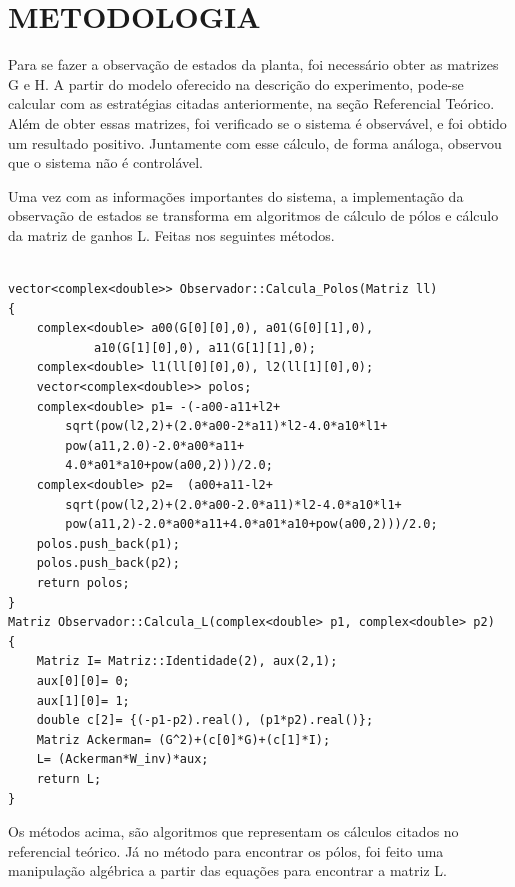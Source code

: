 \documentclass[a4paper,12pt]{article}
\begin{document}
\newpage



\section{METODOLOGIA}

\hspace{4ex}Para se fazer a observação de estados da planta, foi necessário obter as matrizes G e H. A partir do modelo oferecido na descrição do experimento, pode-se calcular com as estratégias citadas anteriormente, na seção Referencial Teórico. Além de obter essas matrizes, foi verificado se o sistema é observável, e foi obtido um resultado positivo. Juntamente com esse cálculo, de forma análoga, observou que o sistema não é controlável.

\hspace{4ex}Uma vez com as informações importantes do sistema, a implementação da observação de estados se transforma em algoritmos de cálculo de pólos e cálculo da matriz de ganhos L. Feitas nos seguintes métodos.

\begin{lstlisting}

vector<complex<double>> Observador::Calcula_Polos(Matriz ll)
{
    complex<double> a00(G[0][0],0), a01(G[0][1],0), 
    		a10(G[1][0],0), a11(G[1][1],0);
    complex<double> l1(ll[0][0],0), l2(ll[1][0],0);
    vector<complex<double>> polos;
    complex<double> p1= -(-a00-a11+l2+
    	sqrt(pow(l2,2)+(2.0*a00-2*a11)*l2-4.0*a10*l1+
    	pow(a11,2.0)-2.0*a00*a11+
    	4.0*a01*a10+pow(a00,2)))/2.0;
    complex<double> p2=  (a00+a11-l2+
    	sqrt(pow(l2,2)+(2.0*a00-2.0*a11)*l2-4.0*a10*l1+
    	pow(a11,2)-2.0*a00*a11+4.0*a01*a10+pow(a00,2)))/2.0;
    polos.push_back(p1);
    polos.push_back(p2);
    return polos;
}
Matriz Observador::Calcula_L(complex<double> p1, complex<double> p2)
{
    Matriz I= Matriz::Identidade(2), aux(2,1);
    aux[0][0]= 0;
    aux[1][0]= 1;
    double c[2]= {(-p1-p2).real(), (p1*p2).real()};
    Matriz Ackerman= (G^2)+(c[0]*G)+(c[1]*I);
    L= (Ackerman*W_inv)*aux;
    return L;
}

\end{lstlisting}

\hspace{4ex}Os métodos acima, são algoritmos que representam os cálculos citados no referencial teórico. Já no método para encontrar os pólos, foi feito uma manipulação algébrica a partir das equações para encontrar a matriz L.
\end{document}
